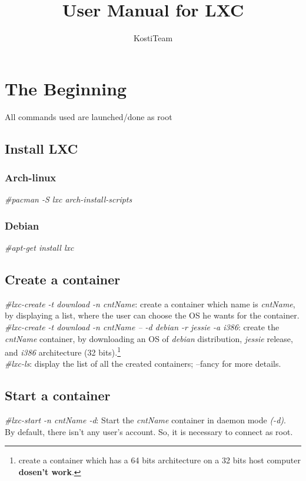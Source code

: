 \documentclass{article}
\author{KostiTeam}
\title{User Manual for LXC}
\begin{document}
\maketitle
\newpage
\tableofcontents
\newpage

\section{The Beginning}
All commands used are launched/done as root

\subsection{Install LXC}
\subsubsection{Arch-linux}
\emph{\#pacman -S lxc arch-install-scripts}
\subsubsection{Debian}
\emph{\#apt-get install lxc}

\subsection{Create a container}
\emph{\#lxc-create -t download -n cntName}: create a container which name is \emph{cntName}, 
by displaying a list, where the user can choose the OS he wants for the container.\\ 

\emph{\#lxc-create -t download -n cntName -- -d debian -r jessie -a i386}: create the \emph{cntName} container, 
by downloading an OS of \emph{debian} distribution, \emph{jessie} release, and \emph{i386} architecture
(32 bits).\footnote{create a container which has a 64 bits architecture on a 32 bits host computer \textbf{dosen't work}.}\\

\emph{\#lxc-ls}: display the list of all the created containers; --fancy for more details.\\
  
\subsection{Start a container}
\emph{\#lxc-start -n cntName  -d}: Start the \emph{cntName} container in daemon mode \emph{(-d)}.\\
By default, there isn't any user's account. So, it is necessary to connect as root.\\
\end{document}
